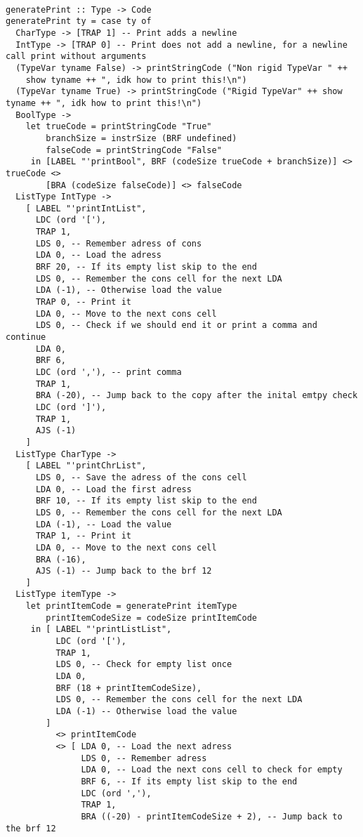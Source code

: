 \documentclass{report}
\begin{document}
\begin{verbatim}

generatePrint :: Type -> Code
generatePrint ty = case ty of
  CharType -> [TRAP 1] -- Print adds a newline
  IntType -> [TRAP 0] -- Print does not add a newline, for a newline call print without arguments
  (TypeVar tyname False) -> printStringCode ("Non rigid TypeVar " ++ 
    show tyname ++ ", idk how to print this!\n")
  (TypeVar tyname True) -> printStringCode ("Rigid TypeVar" ++ show tyname ++ ", idk how to print this!\n")
  BoolType ->
    let trueCode = printStringCode "True"
        branchSize = instrSize (BRF undefined)
        falseCode = printStringCode "False"
     in [LABEL "'printBool", BRF (codeSize trueCode + branchSize)] <> trueCode <>  
        [BRA (codeSize falseCode)] <> falseCode
  ListType IntType ->
    [ LABEL "'printIntList",
      LDC (ord '['),
      TRAP 1,
      LDS 0, -- Remember adress of cons
      LDA 0, -- Load the adress
      BRF 20, -- If its empty list skip to the end
      LDS 0, -- Remember the cons cell for the next LDA
      LDA (-1), -- Otherwise load the value
      TRAP 0, -- Print it
      LDA 0, -- Move to the next cons cell
      LDS 0, -- Check if we should end it or print a comma and continue
      LDA 0,
      BRF 6,
      LDC (ord ','), -- print comma
      TRAP 1,
      BRA (-20), -- Jump back to the copy after the inital emtpy check
      LDC (ord ']'),
      TRAP 1,
      AJS (-1)
    ]
  ListType CharType ->
    [ LABEL "'printChrList",
      LDS 0, -- Save the adress of the cons cell
      LDA 0, -- Load the first adress
      BRF 10, -- If its empty list skip to the end
      LDS 0, -- Remember the cons cell for the next LDA
      LDA (-1), -- Load the value
      TRAP 1, -- Print it
      LDA 0, -- Move to the next cons cell
      BRA (-16),
      AJS (-1) -- Jump back to the brf 12
    ]
  ListType itemType ->
    let printItemCode = generatePrint itemType
        printItemCodeSize = codeSize printItemCode
     in [ LABEL "'printListList",
          LDC (ord '['),
          TRAP 1,
          LDS 0, -- Check for empty list once
          LDA 0,
          BRF (18 + printItemCodeSize),
          LDS 0, -- Remember the cons cell for the next LDA
          LDA (-1) -- Otherwise load the value
        ]
          <> printItemCode
          <> [ LDA 0, -- Load the next adress
               LDS 0, -- Remember adress
               LDA 0, -- Load the next cons cell to check for empty
               BRF 6, -- If its empty list skip to the end
               LDC (ord ','),
               TRAP 1,
               BRA ((-20) - printItemCodeSize + 2), -- Jump back to the brf 12

\end{verbatim}
\end{document}
